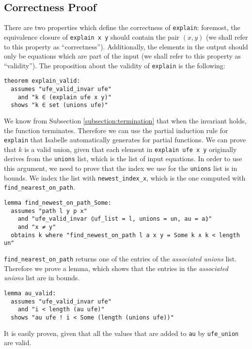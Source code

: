 \subsection{Correctness Proof}

There are two properties which define the correctness of \lstinline|explain|: foremost, the equivalence closure of \lstinline{explain x y} should contain the pair $(x, y)$ (we shall refer to this property as ``correctness''). Additionally, the elements in the output should only be equations which are part of the input (we shall refer to this property as ``validity''). The proposition about the validity of \lstinline{explain} is the following:

\begin{lstlisting}
theorem explain_valid:
  assumes "ufe_valid_invar ufe"
    and "k ∈ (explain ufe x y)"
  shows "k ∈ set (unions ufe)"
\end{lstlisting}

We know from Subsection \ref{subsection:termination} that when the invariant holds, the function terminates. Therefore we can use the partial induction rule for \lstinline|explain| that Isabelle automatically generates for partial functions. We can prove that $k$ is a valid union, given that each element in \lstinline|explain ufe x y| originally derives from the \lstinline{unions} list, which is the list of input equations.
In order to use this argument, we need to prove that the index we use for the \lstinline{unions} list is in bounds.
We index the list with \lstinline|newest_index_x|, which is the one computed with \lstinline{find_nearest_on_path}.

\begin{lstlisting}
lemma find_newest_on_path_Some:
  assumes "path l y p x"
    and "ufe_valid_invar ⦇uf_list = l, unions = un, au = a⦈"
    and "x ≠ y"
  obtains k where "find_newest_on_path l a x y = Some k ∧ k < length un"
\end{lstlisting}

\lstinline{find_nearest_on_path} returns one of the entries of the \emph{associated unions} list.
Therefore we prove a lemma, which shows that the entries in the \emph{associated unions} list are in bounds.

\begin{lstlisting}
lemma au_valid:
  assumes "ufe_valid_invar ufe"
    and "i < length (au ufe)"
  shows "au ufe ! i < Some (length (unions ufe))"
\end{lstlisting}

It is easily proven, given that all the values that are added to \lstinline|au| by \lstinline|ufe_union| are valid.

